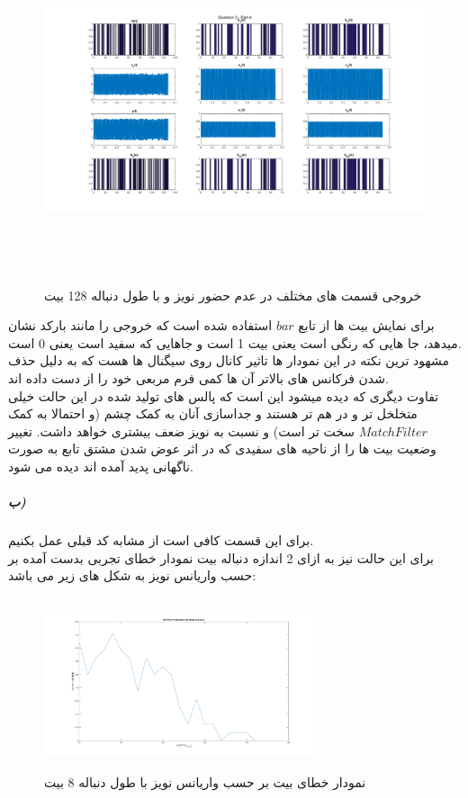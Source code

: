 \documentclass[a4paper,12pt]{article}
\begin{document}
\begin{figure}[htbp]
\centerline{\includegraphics[width=6.625in, height=4in]{../3.Transferring0and1/Q2PA_128.png}}
\caption{خروجی قسمت های مختلف در عدم حضور نویز و با طول دنباله 128 بیت}
\label{fig}
\end{figure}
برای نمایش بیت ها از تابع $bar$ استفاده شده است که خروجی را مانند بارکد نشان میدهد، جا هایی که رنگی است یعنی بیت 1 است و جاهایی که سفید است یعنی 0 است.
\\
مشهود ترین نکته در این نمودار ها تاثیر کانال روی سیگنال ها هست که به دلیل حذف شدن فرکانس های بالاتر آن ها کمی فرم مربعی خود را از دست داده اند.
\\
تفاوت دیگری که دیده میشود این است که پالس های تولید شده در این حالت خیلی متخلخل تر و در هم تر هستند و جداسازی آنان به کمک چشم (و احتمالا به کمک $MatchFilter$ سخت تر است) و نسبت به نویز ضعف بیشتری خواهد داشت. تغییر وضعیت بیت ها را از ناحیه های سفیدی که در اثر عوض شدن مشتق تابع به صورت ناگهانی پدید آمده اند دیده می شود.
\clearpage
\subparagraph{ب)}
برای این قسمت کافی است از مشابه کد قبلی عمل بکنیم.
\\
برای این حالت نیز به ازای 2 اندازه دنباله بیت نمودار خطای تجربی بدست آمده بر حسب واریانس نویز به شکل های زیر می باشد:
\begin{figure}[htbp]
\centerline{\includegraphics[width=3.125in, height=2in]{../3.Transferring0and1/Q2PB_32.png}}
\caption{نمودار خطای بیت بر حسب واریانس نویز با طول دنباله 8 بیت}
\label{fig}
\end{figure}
\end{document}
